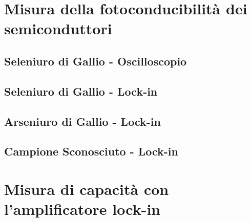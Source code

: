 \documentclass[11pt]{article} %
\begin{document}
\section{Misura della fotoconducibilità dei semiconduttori}
\subsection{Seleniuro di Gallio - Oscilloscopio}
\subsection{Seleniuro di Gallio - Lock-in}
\subsection{Arseniuro di Gallio - Lock-in}
\subsection{Campione Sconosciuto - Lock-in}
\appendix
\section{Misura di capacità con l'amplificatore lock-in}
\end{document}
